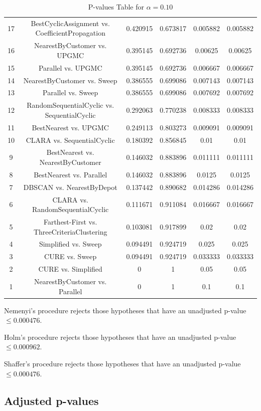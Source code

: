 \documentclass[a4paper,10pt]{article}
\begin{document}
\begin{landscape}
\begin{table}[!htp]
\begin{tabular}{cccccc}
17&BestCyclicAssignment vs. CoefficientPropagation&0.420915&0.673817&0.005882&0.005882\\
16&NearestByCustomer vs. UPGMC&0.395145&0.692736&0.00625&0.00625\\
15&Parallel vs. UPGMC&0.395145&0.692736&0.006667&0.006667\\
14&NearestByCustomer vs. Sweep&0.386555&0.699086&0.007143&0.007143\\
13&Parallel vs. Sweep&0.386555&0.699086&0.007692&0.007692\\
12&RandomSequentialCyclic vs. SequentialCyclic&0.292063&0.770238&0.008333&0.008333\\
11&BestNearest vs. UPGMC&0.249113&0.803273&0.009091&0.009091\\
10&CLARA vs. SequentialCyclic&0.180392&0.856845&0.01&0.01\\
9&BestNearest vs. NearestByCustomer&0.146032&0.883896&0.011111&0.011111\\
8&BestNearest vs. Parallel&0.146032&0.883896&0.0125&0.0125\\
7&DBSCAN vs. NearestByDepot&0.137442&0.890682&0.014286&0.014286\\
6&CLARA vs. RandomSequentialCyclic&0.111671&0.911084&0.016667&0.016667\\
5&Farthest-First vs. ThreeCriteriaClustering&0.103081&0.917899&0.02&0.02\\
4&Simplified vs. Sweep&0.094491&0.924719&0.025&0.025\\
3&CURE vs. Sweep&0.094491&0.924719&0.033333&0.033333\\
2&CURE vs. Simplified&0&1&0.05&0.05\\
1&NearestByCustomer vs. Parallel&0&1&0.1&0.1\\
\hline
\end{tabular}
\caption{P-values Table for $\alpha=0.10$}
\end{table}Nemenyi's procedure rejects those hypotheses that have an unadjusted p-value $\le0.000476$.

Holm's procedure rejects those hypotheses that have an unadjusted p-value $\le0.000962$.

Shaffer's procedure rejects those hypotheses that have an unadjusted p-value $\le0.000476$.

\pagebreak

\subsection{Adjusted p-values}


\end{landscape}
\end{document}
